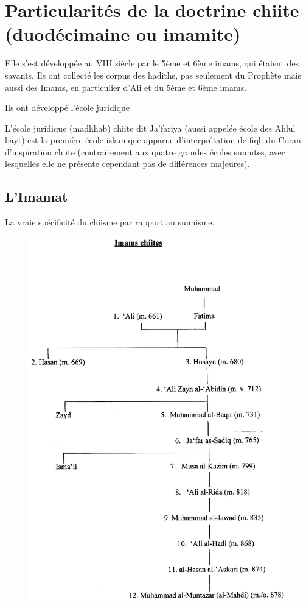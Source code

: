  
 
\section{Particularités de la doctrine chiite (duodécimaine ou imamite)
\label{particularituxe9s-de-la-doctrine-chiite-duoduxe9cimaine-ou-imamite}}


Elle s'est développée au VIII siècle par le 5ème et 6ème imams, qui étaient des savants. Ils ont collecté les corpus des hadiths, pas seulement du Prophète mais aussi des Imams, en particulier d'Ali et du 5ème et 6ème imams.

Ils ont développé l'école juridique
\begin{Def}[Ja'fariya]
 L'école juridique (madhhab) chiite dit Ja'fariya (aussi appelée école des Ahlul bayt) est la première école islamique apparue d'interprétation de fiqh du Coran d'inspiration chiite (contrairement aux quatre grandes écoles sunnites, avec lesquelles elle ne présente cependant pas de différences majeures).
\end{Def}
 
  \subsection{L'Imamat}
 La vraie spécificité du chiisme par rapport au sunnisme. 
 \begin{figure}[h!]
    \centering
\includegraphics[width=0.8 \textwidth]{CourantsIslamContemporain/ImagesCourantsIslamContemporain/image2.png}
    \label{fig:my_label}
\end{figure}

